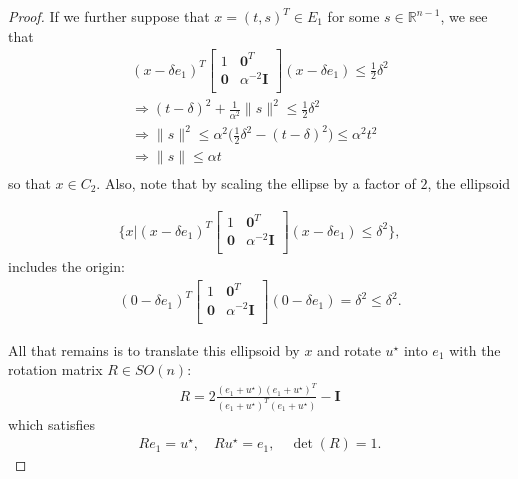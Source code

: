 \begin{proof}
If we further suppose that $x = (t, s)^T \in E_1$ for some $s \in \mathbb R^{n-1}$, we see that
\begin{align*}
(x - \delta e_1)^T\begin{bmatrix}
1 & \boldsymbol0^T \\
\boldsymbol 0 & \alpha^{-2} \boldsymbol I \\
\end{bmatrix}(x - \delta e_1) \le \frac 1 2 \delta^2 \\
\Longrightarrow (t - \delta)^2 + \frac {1} {\alpha^2} \|s\|^2 \le \frac 1 2 \delta^2 \\
\Longrightarrow \|s\|^2 \le \alpha^2 \big(\frac 1 2 \delta^2 - (t - \delta)^2\big) \le \alpha^2t^2\\
\Longrightarrow \|s\| \le \alpha t\\
\end{align*}
so that $x \in C_2$.
Also, note that by scaling the ellipse by a factor of $2$, the ellipsoid

\begin{align*}
\bigg \{x \bigg | (x - \delta e_1)^T\begin{bmatrix}
1 & \boldsymbol0^T \\
\boldsymbol 0 & \alpha^{-2} \boldsymbol I \\
\end{bmatrix}(x - \delta e_1) \le \delta^2 \bigg\},
\end{align*}
includes the origin:
\begin{align*}
(0 - \delta e_1)^T\begin{bmatrix}
1 & \boldsymbol0^T \\
\boldsymbol 0 & \alpha^{-2} \boldsymbol I \\
\end{bmatrix}(0 - \delta e_1) = \delta^2 \le \delta^2.
\end{align*}

All that remains is to translate this ellipsoid by $x$ and rotate $u^{\star}$ into $e_1$ with the rotation matrix $R \in SO(n)$:
\begin{align*}
R = 2\frac{(e_1 + u^{\star})(e_1 +u^{\star})^T}{(e_1 +u^{\star})^T(e_1 +u^{\star})} - \boldsymbol I
\end{align*}
which satisfies
\begin{align*}
Re_1 = u^{\star}, \quad
Ru^{\star} = e_1, \quad
\det(R) = 1.
\end{align*}



\end{proof}
